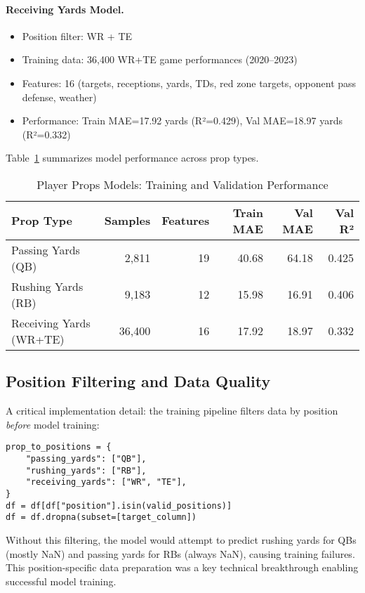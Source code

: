 \paragraph{Receiving Yards Model.}
\begin{itemize}
  \item Position filter: WR + TE
  \item Training data: 36,400 WR+TE game performances (2020--2023)
  \item Features: 16 (targets, receptions, yards, TDs, red zone targets, opponent pass defense, weather)
  \item Performance: Train MAE=17.92 yards (R²=0.429), Val MAE=18.97 yards (R²=0.332)
\end{itemize}

Table~\ref{tab:props-models-performance} summarizes model performance across prop types.

\begin{table}[htbp]
\centering
\caption{Player Props Models: Training and Validation Performance}
\label{tab:props-models-performance}
\begin{tabular}{@{} l r r r r r @{}}
\toprule
Prop Type & Samples & Features & Train MAE & Val MAE & Val R² \\
\midrule
Passing Yards (QB) & 2,811 & 19 & 40.68 & 64.18 & 0.425 \\
Rushing Yards (RB) & 9,183 & 12 & 15.98 & 16.91 & 0.406 \\
Receiving Yards (WR+TE) & 36,400 & 16 & 17.92 & 18.97 & 0.332 \\
\bottomrule
\end{tabular}
\end{table}

\subsection{Position Filtering and Data Quality}

A critical implementation detail: the training pipeline filters data by position \emph{before} model training:
\begin{verbatim}
prop_to_positions = {
    "passing_yards": ["QB"],
    "rushing_yards": ["RB"],
    "receiving_yards": ["WR", "TE"],
}
df = df[df["position"].isin(valid_positions)]
df = df.dropna(subset=[target_column])
\end{verbatim}

Without this filtering, the model would attempt to predict rushing yards for QBs (mostly NaN) and passing yards for RBs (always NaN), causing training failures. This position-specific data preparation was a key technical breakthrough enabling successful model training.

